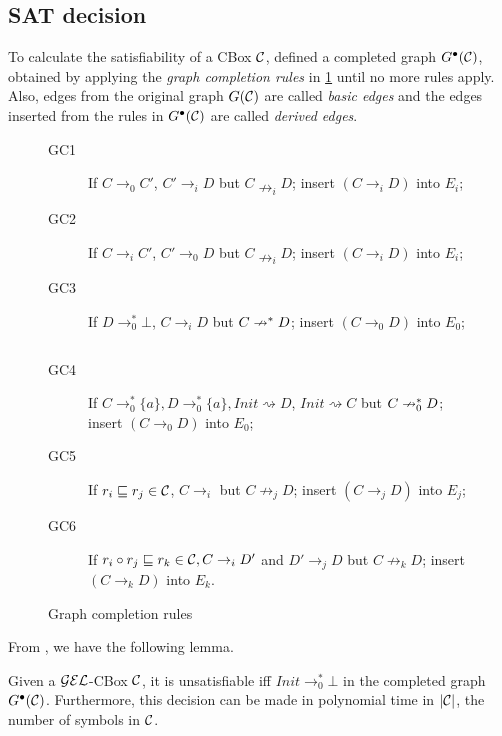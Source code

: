 \subsection{SAT decision}

To calculate the satisfiability of a CBox $\mathcal{C}$, \citet{Fin2020} defined a completed graph $G^\bullet(\mathcal{C})$, obtained by applying the \emph{graph completion rules} in \cref{fig:rules} until no more rules apply. Also, edges from the original graph $G(\mathcal{C})$ are called \emph{basic edges} and the edges inserted from the rules in $G^\bullet(\mathcal{C})$ are called \emph{derived edges}. 

\begin{figure}[h]
	\centering
	\begin{minipage}{0.45\textwidth}
		\begin{description}
			\item[GC1] If $C \to_0 C'$, $C' \to_i D$ but $C \nrightarrow_i D$; insert $(C \to_i D)$ into $E_i$;
			\item[GC2] If $C \to_i C'$, $C' \to_0 D$ but $C \nrightarrow_i D$; insert $(C \to_i D)$ into $E_i$;
			\item[GC3] If $D \to_0^* \bot$, $C \to_i D$ but $C \nrightarrow^* D$; insert $(C \to_0 D)$ into $E_0$;
		\end{description}  \end{minipage}
	$\quad$
	\begin{minipage}{0.45\textwidth}
		\begin{description}
			\item[GC4] If $C \to_0^* \{a\}, D \to_0^* \{a\}, Init \rightsquigarrow D$, $Init \rightsquigarrow C$ but $C \nrightarrow_0^* D$; insert $(C \to_0 D)$ into $E_0$;
			\item[GC5] If $r_i \sqsubseteq r_j \in \mathcal{C}$, $C \to_i$ but $C \not\to_j D$; insert $(C \to_j D)$ into $E_j$;
			\item[GC6] If $r_i \circ r_j \sqsubseteq r_k \in \mathcal{C}, C \to_i D'$ and $D' \to_j D$ but $C \not\to_k D$; insert $(C \to_k D)$ into $E_k$.
		\end{description}  \end{minipage}
	\caption{Graph completion rules}
	\label{fig:rules}
\end{figure}

From \citet{Fin2020}, we have the following lemma.

\begin{lemma}
\label{lemma-comp-sat}
Given a $\mathcal{GEL}$-CBox $\mathcal{C}$, it is unsatisfiable iff $Init \to_0^* \bot$ in the completed graph $G^\bullet(\mathcal{C})$. Furthermore, this decision can be made in polynomial time in $|\mathcal{C}|$, the number of symbols in $\mathcal{C}$.
\end{lemma}


